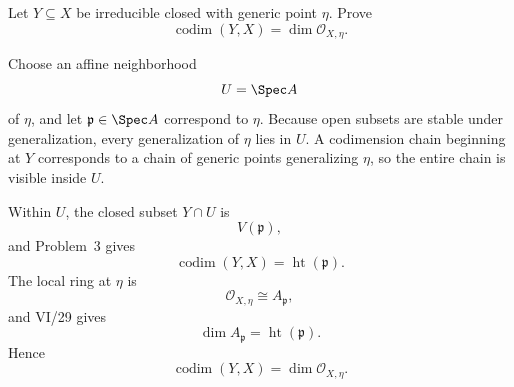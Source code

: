 \begin{problem}\label{prob:vi31-04}
Let \(Y\subseteq X\) be irreducible closed with generic point \(\eta\). Prove
\[
\operatorname{codim}(Y,X)=\dim\mathcal O_{X,\eta}.
\]
\end{problem}

\ifdefined\FullProblemDossiers
\begin{solution}
Choose an affine neighborhood
\[
U=\Spec A
\]
of \(\eta\), and let \(\mathfrak p\in\Spec A\) correspond to \(\eta\). Because open subsets are stable under
generalization, every generalization of \(\eta\) lies in \(U\). A codimension chain beginning at \(Y\) corresponds
to a chain of generic points generalizing \(\eta\), so the entire chain is visible inside \(U\).

Within \(U\), the closed subset \(Y\cap U\) is
\[
V(\mathfrak p),
\]
and Problem~3 gives
\[
\operatorname{codim}(Y,X)
=
\operatorname{ht}(\mathfrak p).
\]
The local ring at \(\eta\) is
\[
\mathcal O_{X,\eta}\cong A_{\mathfrak p},
\]
and VI/29 gives
\[
\dim A_{\mathfrak p}=\operatorname{ht}(\mathfrak p).
\]
Hence
\[
\boxed{
\operatorname{codim}(Y,X)=\dim\mathcal O_{X,\eta}.
}
\]
\end{solution}
\fi
